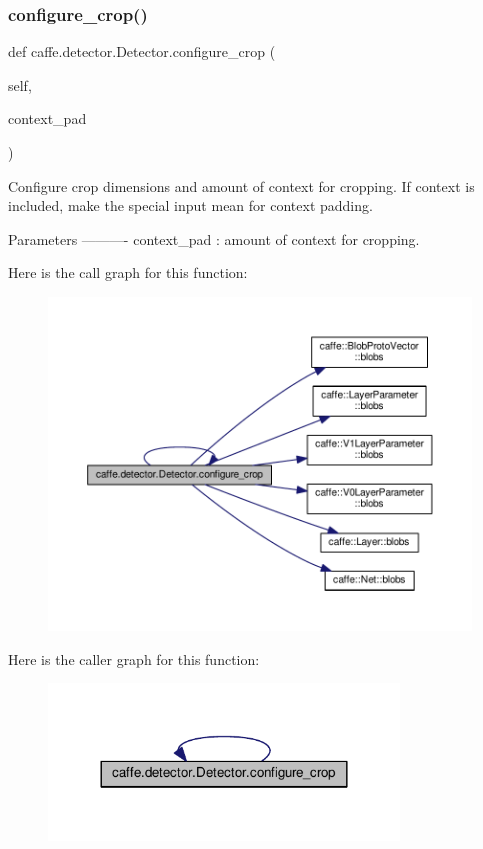 \subsubsection{\texorpdfstring{configure\+\_\+crop()}{configure\_crop()}\hspace{0.1cm}{\footnotesize\ttfamily [1/2]}}
{\footnotesize\ttfamily def caffe.\+detector.\+Detector.\+configure\+\_\+crop (\begin{DoxyParamCaption}\item[{}]{self,  }\item[{}]{context\+\_\+pad }\end{DoxyParamCaption})}

\begin{DoxyVerb}Configure crop dimensions and amount of context for cropping.
If context is included, make the special input mean for context padding.

Parameters
----------
context_pad : amount of context for cropping.
\end{DoxyVerb}
 Here is the call graph for this function\+:
\nopagebreak
\begin{figure}[H]
\begin{center}
\leavevmode
\includegraphics[width=350pt]{classcaffe_1_1detector_1_1_detector_a3706bb8bcd04387c065f7bb6b34f4875_cgraph}
\end{center}
\end{figure}
Here is the caller graph for this function\+:
\nopagebreak
\begin{figure}[H]
\begin{center}
\leavevmode
\includegraphics[width=264pt]{classcaffe_1_1detector_1_1_detector_a3706bb8bcd04387c065f7bb6b34f4875_icgraph}
\end{center}
\end{figure}
